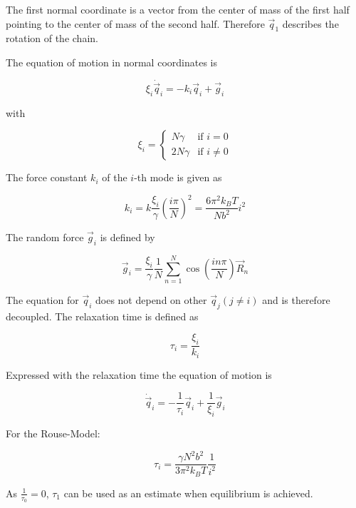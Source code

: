 \documentclass[a4paper]{article}
\begin{document}
The first normal coordinate is a vector from the center of mass of the first half pointing to the center of mass of the second half. Therefore $\vec{q}_1$ describes the rotation of the chain. 

The equation of motion in normal coordinates is

\begin{equation}
\xi_i \dot{\vec{q}}_i = -k_i \vec{q}_i + \vec{g}_i
\end{equation}

with

\begin{equation}
\xi_i = \begin{cases} N \gamma &\mbox{if } i = 0 \\ 
2 N \gamma & \mbox{if } i \neq 0 \end{cases}
\end{equation}

The force constant $k_i$ of the $i$-th mode is given as

\begin{equation}
k_i = k \frac{\xi_i}{\gamma} \left( \frac{i \pi}{N} \right)^2 = \frac{6 \pi^2 k_B T}{N b^2} i^2
\end{equation}

The random force $\vec{g}_i$ is defined by

\begin{equation}
\vec{g}_i = \frac{\xi_i}{\gamma} \frac{1}{N} \sum_{n=1}^N \cos \left( \frac{i n \pi}{N} \right) \vec{R}_n
\end{equation}

The equation for $\vec{q}_i$ does not depend on other $\vec{q}_j (j \neq i)$ and is therefore decoupled. The relaxation time is defined as

\begin{equation}
\tau_i = \frac{\xi_i}{k_i}
\end{equation}

Expressed with the relaxation time the equation of motion is

\begin{equation}
\dot{\vec{q}}_i = - \frac{1}{\tau_i} \vec{q}_i + \frac{1}{\xi_i} \vec{g}_i
\end{equation}

For the Rouse-Model:

\begin{equation}
\tau_i = \frac{\gamma N^2 b^2}{3 \pi^2 k_B T} \frac{1}{i^2}
\end{equation}

As $\frac{1}{\tau_0} = 0$, $\tau_1$ can be used as an estimate when equilibrium is achieved.
\end{document}
